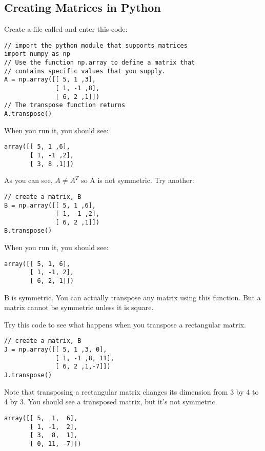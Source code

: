 \subsection{Creating Matrices in Python}
Create a file called  and enter this code:
\begin{Verbatim}
// import the python module that supports matrices
import numpy as np
// Use the function np.array to define a matrix that 
// contains specific values that you supply.
A = np.array([[ 5, 1 ,3], 
              [ 1, -1 ,8], 
              [ 6, 2 ,1]])
// The transpose function returns 
A.transpose()
\end{Verbatim}
When you run it, you should see:
\begin{Verbatim}
array([[ 5, 1 ,6], 
       [ 1, -1 ,2], 
       [ 3, 8 ,1]])
\end{Verbatim}
As you can see, $A\neq A^T$ so A is not symmetric.
Try another: 
\begin{Verbatim}
// create a matrix, B
B = np.array([[ 5, 1 ,6], 
              [ 1, -1 ,2], 
              [ 6, 2 ,1]])
B.transpose()
\end{Verbatim}
When you run it, you should see:
\begin{Verbatim}
array([[ 5, 1, 6], 
       [ 1, -1, 2], 
       [ 6, 2, 1]])
\end{Verbatim}
B is symmetric. You can actually transpose any matrix using this function. But a matrix cannot be symmetric unless it is square. 

Try this code to see what happens when you transpose a rectangular matrix. 
\begin{Verbatim}
// create a matrix, B
J = np.array([[ 5, 1 ,3, 0], 
              [ 1, -1 ,8, 11], 
              [ 6, 2 ,1,-7]])
J.transpose()
\end{Verbatim}
Note that transposing a rectangular matrix changes its dimension from 3 by 4 to 4 by 3. You should see a transposed matrix, but it's not symmetric.
\begin{Verbatim}
array([[ 5,  1,  6],
       [ 1, -1,  2],
       [ 3,  8,  1],
       [ 0, 11, -7]])
\end{Verbatim}

